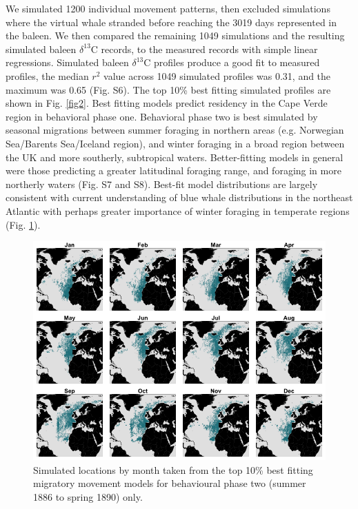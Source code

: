\documentclass[a4paper,12pt]{article}
\begin{document}
We simulated 1200 individual movement patterns, then excluded simulations where the virtual whale stranded before reaching the 3019 days represented in the baleen.
We then compared the remaining 1049 simulations and the resulting simulated baleen $\delta^{13}$C records, to the measured records with simple linear regressions. 
Simulated baleen \(\delta^{13}\)C profiles produce a good fit to measured profiles, the median \(r^{2}\) value across 1049 simulated profiles was 0.31, and the maximum was 0.65 (Fig. S6). 
The top 10\% best fitting simulated profiles are shown in Fig. \ref{fig2}. 
Best fitting models predict residency in the Cape Verde region in behavioral phase one. 
Behavioral phase two is best simulated by seasonal migrations between summer foraging in northern areas (e.g. Norwegian Sea/Barents Sea/Iceland region), and winter foraging in a broad region between the UK and more southerly, subtropical waters. 
Better-fitting models in general were those predicting a greater latitudinal foraging range, and foraging in more northerly waters (Fig. S7 and S8). 
Best-fit model distributions are largely consistent with current understanding of blue whale distributions in the northeast Atlantic \cite{reeves2004historical,baines2014upwellings,baines2017autumn,reeves2004historical} with perhaps greater importance of winter foraging in temperate regions (Fig. \ref{fig4}).

\begin{figure}
 \centering
  \includegraphics[width = \linewidth]{figures/Figure-4-monthly.png}
  \caption{Simulated locations by month taken from the top 10\% best fitting migratory movement models for behavioural phase two (summer 1886 to spring 1890) only.}
  \label{fig4}
\end{figure}
\end{document}
